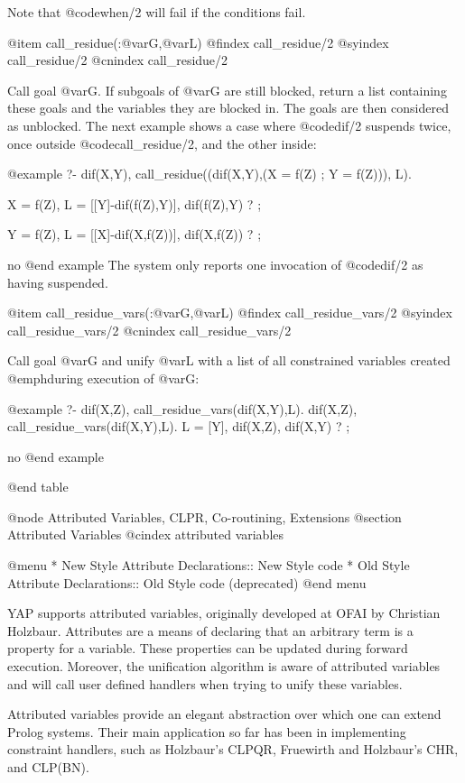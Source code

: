 Note that @code{when/2} will fail if the conditions fail.

@item call_residue(:@var{G},@var{L})
@findex call_residue/2
@syindex call_residue/2
@cnindex call_residue/2

Call goal @var{G}. If subgoals of @var{G} are still blocked, return
a list containing these goals and the variables they are blocked in. The
goals are then considered as unblocked. The next example shows a case
where @code{dif/2} suspends twice, once outside @code{call_residue/2},
and the other inside:

@example
?- dif(X,Y),
       call_residue((dif(X,Y),(X = f(Z) ; Y = f(Z))), L).

X = f(Z),
L = [[Y]-dif(f(Z),Y)],
dif(f(Z),Y) ? ;

Y = f(Z),
L = [[X]-dif(X,f(Z))],
dif(X,f(Z)) ? ;

no
@end example
The system only reports one invocation of @code{dif/2} as having
suspended. 

@item call_residue_vars(:@var{G},@var{L})
@findex call_residue_vars/2
@syindex call_residue_vars/2
@cnindex call_residue_vars/2

Call goal @var{G} and unify @var{L} with a list of all constrained variables created @emph{during} execution of @var{G}:

@example
  ?- dif(X,Z), call_residue_vars(dif(X,Y),L).
dif(X,Z), call_residue_vars(dif(X,Y),L).
L = [Y],
dif(X,Z),
dif(X,Y) ? ;

no
@end example

@end table

@node Attributed Variables, CLPR, Co-routining, Extensions
@section Attributed Variables
@cindex attributed variables

@menu
* New Style Attribute Declarations:: New Style code
* Old Style Attribute Declarations:: Old Style code (deprecated)
@end menu

YAP supports attributed variables, originally developed at OFAI by
Christian Holzbaur. Attributes are a means of declaring that an
arbitrary term is a property for a variable. These properties can be
updated during forward execution. Moreover, the unification algorithm is
aware of attributed variables and will call user defined handlers when
trying to unify these variables.

Attributed variables provide an elegant abstraction over which one can
extend Prolog systems. Their main application so far has been in
implementing constraint handlers, such as Holzbaur's CLPQR, Fruewirth
and Holzbaur's CHR, and CLP(BN). 

